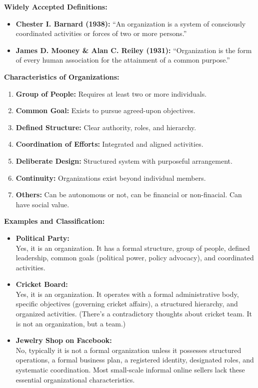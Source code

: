 \documentclass[10pt,a4paper]{book}
\begin{document}
\begin{multicols}{2}
\textbf{Widely Accepted Definitions:}
\begin{itemize}
    \item \textbf{Chester I. Barnard (1938):} ``An organization is a system of consciously coordinated activities or forces of two or more persons.''
    \item \textbf{James D. Mooney \& Alan C. Reiley (1931):} ``Organization is the form of every human association for the attainment of a common purpose.''
\end{itemize}

\textbf{Characteristics of Organizations:}
\begin{enumerate}
    \item \textbf{Group of People:} Requires at least two or more individuals.
    \item \textbf{Common Goal:} Exists to pursue agreed-upon objectives.
    \item \textbf{Defined Structure:} Clear authority, roles, and hierarchy.
    \item \textbf{Coordination of Efforts:} Integrated and aligned activities.
    \item \textbf{Deliberate Design:} Structured system with purposeful arrangement.
    \item \textbf{Continuity:} Organizations exist beyond individual members.
    \item \textbf{Others:} Can be autonomous or not, can be financial or non-finacial. Can have social value.
\end{enumerate}

\textbf{Examples and Classification:}

\begin{itemize}
    \item \textbf{Political Party:} \\
    Yes, it is an organization. It has a formal structure, group of people, defined leadership, common goals (political power, policy advocacy), and coordinated activities.
    
    \item \textbf{Cricket Board:} \\
    Yes, it is an organization. It operates with a formal administrative body, specific objectives (governing cricket affairs), a structured hierarchy, and organized activities. (There's a contradictory thoughts about cricket team. It is not an organization, but a team.) 

    \item \textbf{Jewelry Shop on Facebook:} \\
    No, typically it is not a formal organization unless it possesses structured operations, a formal business plan, a registered identity, designated roles, and systematic coordination. Most small-scale informal online sellers lack these essential organizational characteristics.
    

\end{itemize}
\end{multicols}
\end{document}
